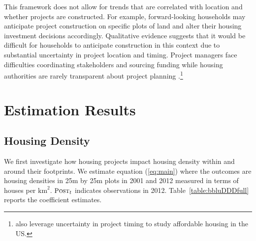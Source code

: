 \documentclass[12pt]{article}
\begin{document}
This framework does not allow for trends that are correlated with location and whether projects are constructed.  For example, forward-looking households may anticipate project construction on specific plots of land and alter their housing investment decisions accordingly.  Qualitative evidence suggests that it would be difficult for households to anticipate construction in this context due to substantial uncertainty in project location and timing.  Project managers face difficulties coordinating stakeholders and sourcing funding while housing authorities are rarely transparent about project planning \citep{serihistory}.\footnote{\cite{diamond2016wants} also leverage uncertainty in project timing to study affordable housing in the US.} 





\section{Estimation Results}\label{section:results}





\subsection{Housing Density}\label{section:bbluestimates}

We first investigate how housing projects impact housing density within and around their footprints.  We estimate equation (\ref{eq:main}) where the outcomes are housing densities in 25m by 25m plots in 2001 and 2012 measured in terms of houses per $\text{km}^{2}$.  $\textsc{\small Post}_{t}$ indicates observations in 2012.  Table~\ref{table:bbluDDDfull} reports the coefficient estimates.
\end{document}
